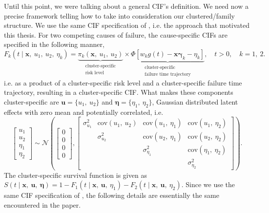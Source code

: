 Until this point, we were talking about a general CIF's definition. We
need now a precise framework telling how to take into consideration our
clustered/family structure. We use the same CIF specification of
, i.e. the approach that motivated this thesis. For
two competing causes of failure, the cause-specific CIFs are specified
in the following manner,
\begin{equation}
  F_{k} (t \mid \mathbf{x},~u_{1},~u_{2},~\eta_{k}) =
  \underbrace{\pi_{k}(\mathbf{x},~u_{1},~u_{2})}_{
    \substack{\text{cluster-specific}\\\text{risk level}}}\times
  \underbrace{\Phi[w_{k} g(t) - \mathbf{x}\bm{\gamma}_{k} - \eta_{k}]}_{
    \substack{\text{cluster-specific}\\\text{failure time trajectory}}
  }, \quad t > 0, \quad k = 1,~2.
  \label{eq:cif}
\end{equation}
i.e. as a product of a cluster-specific risk level and a
cluster-specific failure time trajectory, resulting in a
cluster-specific CIF. What makes these components cluster-specific are
\(\bm{u} = \{u_{1},~u_{2}\}\) and \(\bm{\eta} =
\{\eta_{1},~\eta_{2}\}\), Gaussian distributed latent effects with zero
mean and potentially correlated, i.e.
\[
  \begin{bmatrix} u_{1}\\u_{2}\\\eta_{1}\\\eta_{2} \end{bmatrix} \sim
  \mathcal{N} \left(\begin{bmatrix} 0\\0\\0\\0\end{bmatrix},
    \begin{bmatrix}
      \sigma_{u_{1}}^{2}&
      \text{cov}(u_{1},~u_{2})&
      \text{cov}(u_{1},~\eta_{1})&\text{cov}(u_{1},~\eta_{2})\\
      &\sigma_{u_{2}}^{2}&
      \text{cov}(u_{2},~\eta_{1})&\text{cov}(u_{2},~\eta_{2})\\
      &&\sigma_{\eta_{1}}^{2}&\text{cov}(\eta_{1},~\eta_{2})\\
      &&&\sigma_{\eta_{2}}^{2}
    \end{bmatrix}\right).
\]
The cluster-specific survival function is given as \(S(t \mid
\mathbf{x},~\bm{u},~\bm{\eta}) = 1 - F_{1} (t \mid
\mathbf{x},~\bm{u},~\eta_{1}) - F_{2} (t \mid
\mathbf{x},~\bm{u},~\eta_{2})\). Since we use the same CIF specification
of , the following details are essentially the same
encountered in the paper.

